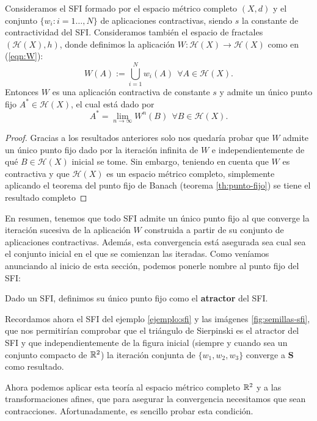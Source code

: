 \begin{teorema}
    Consideramos el SFI formado por el espacio métrico completo $(X,d)$ y el conjunto $\{w_i:i=1\dots, N\}$ de aplicaciones contractivas, siendo $s$ la constante de contractividad del SFI. Consideramos también el espacio de fractales $(\mathcal{H}(X),h)$, donde definimos la aplicación $W:\mathcal{H}(X)\longrightarrow\mathcal{H}(X)$ como en (\ref{eqn:W}):
    $$
    W(A) := \bigcup_{i=1}^N w_i(A) \ \ \forall A\in\mathcal{H}(X).
    $$
    Entonces $W$ es una aplicación contractiva de constante $s$ y admite un único punto fijo \linebreak $A^*\in\mathcal{H}(X)$, el cual está dado por 
    $$
    A^*=\lim_{n\rightarrow\infty} W^n(B) \ \ \forall B\in\mathcal{H}(X).
    $$

\end{teorema}
\begin{proof}
    Gracias a los resultados anteriores solo nos quedaría probar que $W$ admite un único punto fijo dado por la iteración infinita de $W$ e independientemente de qué $B\in\mathcal{H}(X)$ inicial se tome. Sin embargo, teniendo en cuenta que $W$ es contractiva y que $\mathcal{H}(X)$ es un espacio métrico completo, simplemente aplicando el teorema del punto fijo de Banach (teorema \ref{th:punto-fijo}) se tiene el resultado completo
\end{proof}

En resumen, tenemos que todo SFI admite un único punto fijo al que converge la iteración sucesiva de la aplicación $W$ construida a partir de su conjunto de aplicaciones contractivas. Además, esta convergencia está asegurada sea cual sea el conjunto inicial en el que se comienzan las iteradas. Como veníamos anunciando al inicio de esta sección, podemos ponerle nombre al punto fijo del SFI:

\begin{definicion}[Atractor]
    Dado un SFI, definimos su único punto fijo como el \textbf{atractor} del SFI.    
\end{definicion}

Recordamos ahora el SFI del ejemplo \ref{ejemplo:sfi} y las imágenes \ref{fig:semillas-sfi}, que nos permitirían comprobar que el triángulo de Sierpinski es el atractor del SFI y que independientemente de la figura inicial (siempre y cuando sea un conjunto compacto de $\mathbb{R}^2$) la iteración conjunta de $\{w_1,w_2,w_3\}$ converge a $\mathbf{S}$ como resultado.

Ahora podemos aplicar esta teoría al espacio métrico completo $\mathbb{R}^2$ y a las transformaciones afines, que para asegurar la convergencia necesitamos que sean contracciones. Afortunadamente, es sencillo probar esta condición.

